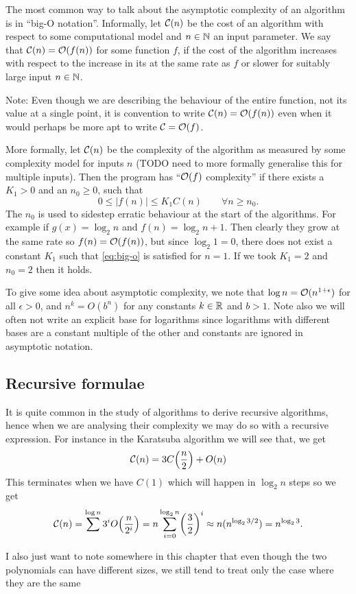 The most common way to talk about the asymptotic complexity of an algorithm is in ``big-O notation''. Informally, let $\mathcal C(n)$ be the cost of an algorithm with respect to some computational model and $n \in {\mathbb N}$ an input parameter. We say that $\mathcal C(n) = \mathcal O(f(n))$ for some function $f$, if the cost of the algorithm increases with respect to the increase in its at the same rate as $f$ or slower for suitably large input $n \in {\mathbb N}$.

Note: Even though we are describing the behaviour of the entire function, not its value at a single point, it is convention to write $\mathcal C(n) = \mathcal O(f(n))$ even when it would perhaps be more apt to write $\mathcal C = \mathcal O(f)$.

More formally, let $\mathcal C(n)$ be the complexity of the algorithm as measured by some complexity model for inputs $n$ (TODO need to more formally generalise this for multiple inputs). Then the program has ``$\mathcal O(f)$ complexity'' if there exists a $K_1 > 0$  and an $n_0 \geq 0$, such that 
\begin{equation}\label{eq:big-o}
    0 \leq |f(n)| \leq K_1C(n) \qquad \forall n \geq n_0.
\end{equation}
The $n_0$ is used to sidestep erratic behaviour at the start of the algorithms. For example if $g(x) = \log_2 n$ and $f(n) = \log_2 n + 1$. Then clearly they grow at the same rate so $f(n) = \mathcal O(f(n))$, but since $\log_2 1 = 0$, there does not exist a constant $K_1$ such that \eqref{eq:big-o} is satisfied for $n = 1$. If we took $K_1 = 2$ and $n_0 = 2$ then it holds.

To give some idea about asymptotic complexity, we note that $\log n = \mathcal O(n^{1 + \epsilon})$ for all $\epsilon > 0$, and $n^k = O(b^n)$ for any constants $k \in {\mathbb R}$ and $b > 1$. Note also we will often not write an explicit base for logarithms since logarithms with different bases are a constant multiple of the other and constants are ignored in asymptotic notation. 

\subsection{Recursive formulae}%
\label{sub:Recursive forumulae}

It is quite common in the study of algorithms to derive recursive algorithms, hence when we are analysing their complexity we may do so with a recursive expression. For instance in the Karatsuba algorithm we will see that, we get
\[
    \M{C}(n) = 3C\bb{\frac{n}{2}} + O(n)
\]
This terminates when we have $C(1)$ which will happen in $\log_2 n$ steps so we get
\[
    \M{C}(n) = \sum^{\log n} 3^i O\bb{\frac{n}{2^i}} = n\sum^{\log_2 n}_{i=0} \bb{\frac{3}{2}}^i \approx n(n^{\log_2 3/2}) = n^{\log_2 3}.
\]

I also just want to note somewhere in this chapter that even though the two polynomials can have different sizes, we still tend to treat only the case where they are the same
